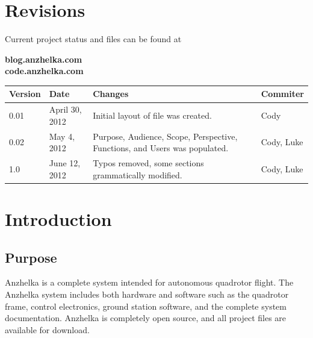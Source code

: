 \documentclass[english]{article}
\numberwithin{equation}{section} %
\begin{document}

\renewcommand{\contentsname}{Table of Contents}
\tableofcontents


\section*{Revisions}
Current project status and files can be found at
\begin{center}
 \textbf{blog.anzhelka.com} \\
 \textbf{code.anzhelka.com} \\
\end{center}

\begin{longtable}{l | l | p{5cm} | l}
\hline
\textbf{Version} & \textbf{Date} & \textbf{Changes} & \textbf{Commiter}\\
\hline
0.01	& April 30, 2012 & Initial layout of file was created. 	& Cody \\
\hline
0.02	& May 4, 2012 & Purpose, Audience, Scope, Perspective, Functions, and Users was populated. & Cody, Luke \\
\hline
1.0 & June 12, 2012 & Typos removed, some sections grammatically modified. & Cody, Luke \\
\hline

\end{longtable}



\newpage
{}




\section{Introduction}
\subsection{Purpose}
Anzhelka is a complete system intended for autonomous quadrotor flight. The Anzhelka system includes both hardware and software such as the quadrotor frame, control electronics, ground station software, and the complete system documentation. Anzhelka is completely open source, and all project files are available for download.
\end{document}
